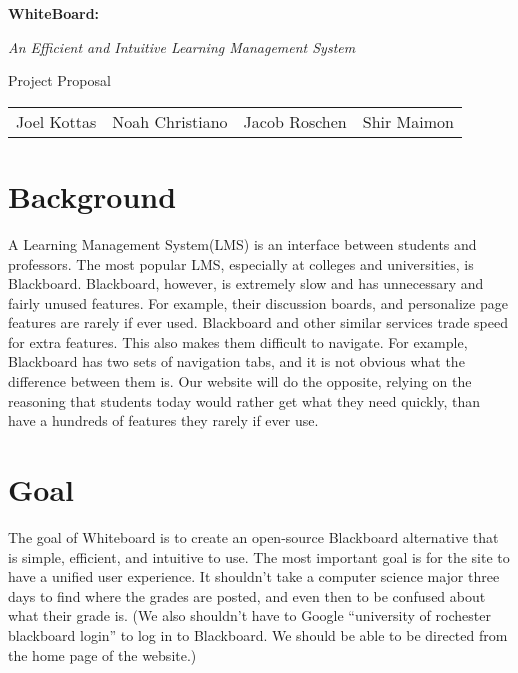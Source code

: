 \documentclass{article}
\begin{document}
\begin{center}
    \huge{\textbf{WhiteBoard:}}
    
    \huge{\textit{An Efficient and Intuitive Learning Management System}}

    \huge{Project Proposal}

    \vspace{10 pt}

    \large{
        \begin{tabular}{cccc}
            Joel Kottas&Noah Christiano&Jacob Roschen&Shir Maimon\\
        \end{tabular}
    }

\end{center}

\vspace{10 pt}

\section{Background}

A Learning Management System(LMS) is an interface between students and
professors. The most popular LMS, especially at colleges and universities, is
Blackboard. Blackboard, however, is extremely slow and has unnecessary and
fairly unused features. For example, their discussion boards, and personalize
page features are rarely if ever used. Blackboard and other similar services
trade speed for extra features. This also makes them difficult to navigate.
For example, Blackboard has two sets of navigation tabs, and it is not obvious
what the difference between them is. Our website will do the opposite, relying
on the reasoning that students today would rather get what they need quickly,
than have a hundreds of features they rarely if ever use.

\section{Goal}

The goal of Whiteboard is to create an open-source Blackboard alternative that
is simple, efficient, and intuitive to use. The most important goal is for the
site to have a unified user experience. It shouldn't take a computer science
major three days to find where the grades are posted, and even then to be
confused about what their grade is. (We also shouldn't have to Google
``university of rochester blackboard login'' to log in to Blackboard. We should
be able to be directed from the home page of the website.)
\end{document}
